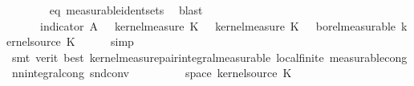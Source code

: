 \begin{isabellebody}
\ \ \ \ \ \ \isamarkupfalse%
\ eq\ measurable{\isacharunderscore}{\kern0pt}ident{\isacharunderscore}{\kern0pt}sets\ \isamarkupfalse%
\ blast\isanewline
\ \ \ \ \isamarkupfalse%
\isanewline
\ \ \isamarkupfalse%
\ \isamarkupfalse%
\ {\isachardoublequoteopen}{\isacharparenleft}{\kern0pt}{\isasymlambda}{\isasymomega}\ {\isasymintegral}\isactrlsup {\isacharplus}{\kern0pt}\ {\isasymomega}\ {\isasymintegral}\isactrlsup {\isacharplus}{\kern0pt}\ {\isasymomega}\ indicator\ A{\isacharprime}{\kern0pt}\ {\isacharparenleft}{\kern0pt}{\isasymomega}\ {\isasymomega}\ {\isasympartial}kernel{\isacharunderscore}{\kern0pt}measure\ K{\isacharunderscore}{\kern0pt}{}\ {\isacharparenleft}{\kern0pt}{\isasymomega}\ {\isasymomega}\ {\isasympartial}kernel{\isacharunderscore}{\kern0pt}measure\ K{\isacharunderscore}{\kern0pt}{}\ {\isasymomega}\ {\isasymin}\ borel{\isacharunderscore}{\kern0pt}measurable\ {\isacharparenleft}{\kern0pt}kernel{\isacharunderscore}{\kern0pt}source\ K{\isacharunderscore}{\kern0pt}{}{\isacharparenright}{\kern0pt}{\isachardoublequoteclose}\isanewline
\ \ \ \ \isamarkupfalse%
\ simp\isanewline
\ \ \ \ \isamarkupfalse%
\ {\isacharparenleft}{\kern0pt}smt\ {\isacharparenleft}{\kern0pt}verit{\isacharcomma}{\kern0pt}\ best{\isacharparenright}{\kern0pt}\ kernel{\isacharunderscore}{\kern0pt}measure{\isacharunderscore}{\kern0pt}pair{\isacharunderscore}{\kern0pt}integral{\isacharunderscore}{\kern0pt}measurable\ local{\isachardot}{\kern0pt}finite{\isacharparenleft}{\kern0pt}{}{\isacharparenright}{\kern0pt}\ measurable{\isacharunderscore}{\kern0pt}cong\ nn{\isacharunderscore}{\kern0pt}integral{\isacharunderscore}{\kern0pt}cong\ snd{\isacharunderscore}{\kern0pt}conv{\isacharparenright}{\kern0pt}\isanewline
{}\isamarkupfalse%
\isanewline
\ \ \isamarkupfalse%
\ {\isasymomega}\ \isamarkupfalse%
\ {\isacharasterisk}{\kern0pt}{\isacharcolon}{\kern0pt}\ {\isachardoublequoteopen}{\isasymomega}\ {\isasymin}\ space\ {\isacharparenleft}{\kern0pt}kernel{\isacharunderscore}{\kern0pt}source\ K{\isacharunderscore}{\kern0pt}{}{\isacharparenright}{\kern0pt}{\isachardoublequoteclose}\isanewline

\end{isabellebody}
